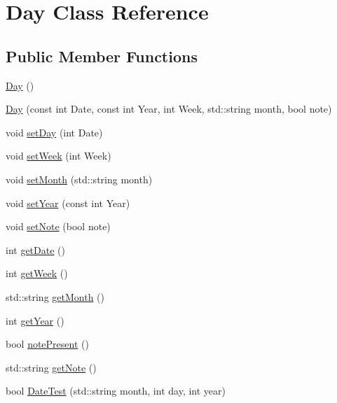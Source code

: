 \hypertarget{classDay}{\section{Day Class Reference}
\label{classDay}
}
\subsection*{Public Member Functions}
\begin{DoxyCompactItemize}
\item 
\hyperlink{classDay_a0d38b5839dd80b179cb8f0669283b3aa}{Day} ()
\item 
\hyperlink{classDay_a1f2f885b1328511d8b96b050673ba35d}{Day} (const int Date, const int Year, int Week, std\-::string month, bool note)
\item 
void \hyperlink{classDay_a0dcbab77f0504f01fdd9a8584b590121}{set\-Day} (int Date)
\item 
void \hyperlink{classDay_abd9ffcfab90af3e2defaa2491a3761bb}{set\-Week} (int Week)
\item 
void \hyperlink{classDay_aa6fc8b1b08074305e6b0dd3f4bc21151}{set\-Month} (std\-::string month)
\item 
void \hyperlink{classDay_a9fc013d905327fd70003970125247d91}{set\-Year} (const int Year)
\item 
void \hyperlink{classDay_a40f873f51621bdb3cf657e127d43cdaf}{set\-Note} (bool note)
\item 
int \hyperlink{classDay_a6161ef9f7717d596af00031cc362fa04}{get\-Date} ()
\item 
int \hyperlink{classDay_a43799b84e1a16df9bf16b3de69605b9a}{get\-Week} ()
\item 
std\-::string \hyperlink{classDay_ae10fc576ccdf6d58ef42c8cd1b371401}{get\-Month} ()
\item 
int \hyperlink{classDay_acec9a2c25c4e19fa6f46cd2671dfa51d}{get\-Year} ()
\item 
bool \hyperlink{classDay_a097b2409c34e772e1b133c2c344ab2bf}{note\-Present} ()
\item 
std\-::string \hyperlink{classDay_ac0d1e5a970de4e30bc563c33cf69cbc3}{get\-Note} ()
\item 
bool \hyperlink{classDay_afb77f4b9df921cfb4176ba6ef309b9b8}{Date\-Test} (std\-::string month, int day, int year)
\end{DoxyCompactItemize}


